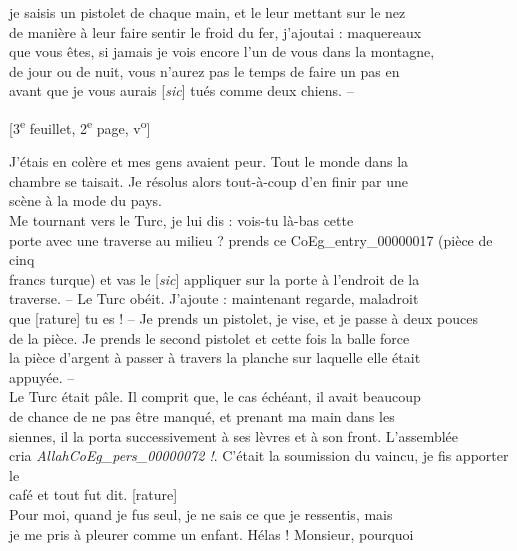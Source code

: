 \documentclass{book}
\begin{document}
je saisis un pistolet de chaque main, et le leur mettant sur le nez\\
de manière à leur faire sentir le froid du fer, j’ajoutai : maquereaux\\
que vous êtes, si jamais je vois encore l’un de vous dans la montagne,\\
de jour ou de nuit, vous n’aurez pas le temps de faire un pas en\\
avant que je vous aurais {[\textit{sic}]} tués comme deux chiens. –
{\footnotesize\begin{center} {[3\textsuperscript{e} feuillet, 2\textsuperscript{e} page, v\textsuperscript{o}]}\end{center}}
\indent J’étais en colère et mes gens avaient peur. Tout le monde dans la\\
chambre se taisait. Je résolus alors tout-à-coup d’en finir par une\\
scène à la mode du pays.\\
\indent Me tournant vers le Turc, je lui dis : vois-tu là-bas cette\\
porte avec une traverse au milieu ? prends ce \gls{CoEg_entry_00000017} (pièce de cinq\\
francs turque) et vas le {[\textit{sic}]} appliquer sur la porte à l’endroit de la\\
traverse. – Le Turc obéit. J’ajoute : maintenant regarde, maladroit\\
que [rature] tu es ! – Je prends un pistolet, je vise, et je passe à deux pouces\\
de la pièce. Je prends le second pistolet et cette fois la balle force\\
la pièce d’argent à passer à travers la planche sur laquelle elle était\\
appuyée. –\\
\indent Le Turc était pâle. Il comprit que, le cas échéant, il avait beaucoup\\
de chance de ne pas être manqué, et prenant ma main dans les\\
siennes, il la porta successivement à ses lèvres et à son front. L’assemblée\\
cria \textit{Allah\gls{CoEg_pers_00000072} !}. C’était la soumission du vaincu, je fis apporter le\\
café et tout fut dit. [rature]\\
\indent Pour moi, quand je fus seul, je ne sais ce que je ressentis, mais\\
je me pris à pleurer comme un enfant. Hélas ! Monsieur, pourquoi\\
\end{document}

